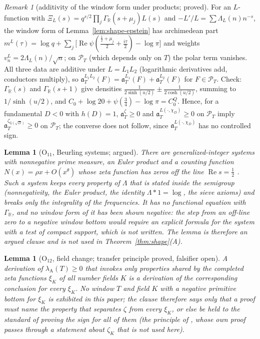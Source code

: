 \documentclass[11pt]{amsart}
\newtheorem{lemma}[theorem]{Lemma}
\theoremstyle{definition}
\theoremstyle{remark}
\newtheorem{remark}[theorem]{Remark}
\newcommand{\R}{\mathbb R}
\newcommand{\Q}{\mathbb Q}
\newcommand{\Rel}{\operatorname{Re}}
\newcommand{\PT}{\mathcal P_T}
\newcommand{\lamA}{\lambda_{\mathrm A}(T)}
\begin{document}
\begin{remark}[additivity of the window form under products; proved]\label{rem:shape-additive}
For an $L$-function with $\Xi_L(s)=q^{s/2}\prod_j\Gamma_\R(s+\mu_j)L(s)$ and $-L'/L=\sum\Lambda_L(n)n^{-s}$, the window form
of Lemma~\ref{lem:shape-epstein} has archimedean part $m^L(\tau)=\log q+\sum_j\big[\Rel\psi(\frac{\frac12+\mu_j}2+\frac{i\tau}2)-\log\pi\big]$
and weights $v^L_n=2\Lambda_L(n)/\sqrt n$; on $\PT$ (which depends only on $T$) the polar term vanishes. All three data are additive under
$L=L_1L_2$ (logarithmic derivatives add, conductors multiply), so $\mathfrak a_T^{L_1L_2}(F)=\mathfrak a_T^{L_1}(F)+\mathfrak a_T^{L_2}(F)$ for
$F\in\PT$. Check: $\Gamma_\R(s)$ and $\Gamma_\R(s+1)$ give densities $\frac1{2\sinh(u/2)}\pm\frac1{2\cosh(u/2)}$, summing to $1/\sinh(u/2)$, and
$C_0+\log20+\psi(\frac34)-\log\pi=C_0^Q$. Hence, for a fundamental $D<0$ with $h(D)=1$, $\mathfrak a_T^{\zeta}\ge0$ and $\mathfrak a_T^{L(\cdot,\chi_D)}\ge0$
on $\PT$ imply $\mathfrak a_T^{\zeta_{\Q(\sqrt D)}}\ge0$ on $\PT$; the converse does not follow, since $\mathfrak a_T^{L(\cdot,\chi_D)}$ has no
controlled sign.
\end{remark}

\begin{lemma}[$\mathrm O_{11}$, Beurling systems; argued]\label{lem:shape-beurling}
There are generalized-integer systems with nonnegative prime measure, an Euler product and a counting function $N(x)=\rho x+O(x^\theta)$
whose zeta function has zeros off the line $\Rel s=\frac12$ \cite{DiamondZhang2016}. Such a system keeps every property of $\Lambda$ that is
stated inside the semigroup (nonnegativity, the Euler product, the identity $\Lambda*1=\log$, the sieve axioms) and breaks only the
integrality of the frequencies. It has no functional equation with $\Gamma_\R$, and no window form of it has been shown negative: the
step from an off-line zero to a negative window bottom would require an explicit formula for the system with a test of compact support,
which is not written. The lemma is therefore an argued clause and is not used in Theorem~\ref{thm:shape}(A).
\end{lemma}

\begin{lemma}[$\mathrm O_{12}$, field change; transfer principle proved, falsifier open]\label{lem:shape-field}
A derivation of $\lamA\ge0$ that invokes only properties shared by the completed zeta functions $\xi_K$ of all number fields $K$ is a
derivation of the corresponding conclusion for every $\xi_K$. No window $T$ and field $K$ with a negative primitive bottom for $\xi_K$
is exhibited in this paper; the clause therefore says only that a proof must name the property that separates $\zeta$ from every
$\xi_K$, or else be held to the standard of proving the sign for all of them (the principle of \cite[Thm.~18.1]{Paper46}, whose own
proof passes through a statement about $\zeta_K$ that is not used here).
\end{lemma}
\end{document}
